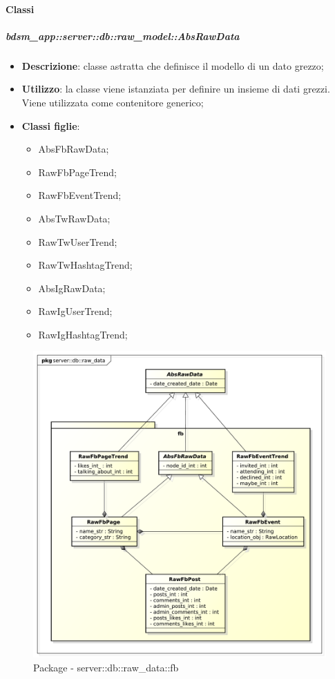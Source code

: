 	\paragraph{Classi} %
		

		\subparagraph{bdsm\_app::server::db::raw\_model::AbsRawData} %
		\label{subp:bdsm_app_server_raw_model_AbsRawData}
			\begin{itemize}
				\item \textbf{Descrizione}: classe astratta che definisce il modello di un dato grezzo;
				\item \textbf{Utilizzo}: la classe viene istanziata per definire un insieme di dati grezzi. Viene utilizzata come contenitore generico;
				\item \textbf{Classi figlie}:
					\begin{itemize}
						\item AbsFbRawData;
						\item RawFbPageTrend;
						\item RawFbEventTrend;
						\item AbsTwRawData;
						\item RawTwUserTrend;
						\item RawTwHashtagTrend;
						\item AbsIgRawData;
						\item RawIgUserTrend;
						\item RawIgHashtagTrend;
					\end{itemize}
			\end{itemize}




		\begin{figure}[htbp]
			\centering
			\centerline{\includegraphics[scale=0.5]{./images/server/raw_data_fb.pdf}}
			\caption{Package - server::db::raw\_data::fb}
		\end{figure}

